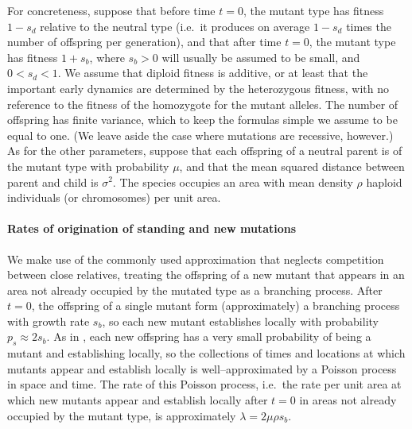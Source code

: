 \documentclass{article}
\begin{document}
For concreteness, suppose that before time $t=0$,
the mutant type has fitness $1-s_d$ relative to the neutral type
(i.e.\ it produces on average $1-s_d$ times the number of offspring per generation),
and that after time $t=0$,
the mutant type has fitness $1+s_b$,
where $s_b>0$ will usually be assumed to be small, and $0<s_d<1$.
We assume that diploid fitness is additive, or at least that the
important early dynamics are determined by the heterozygous fitness, with no reference to the fitness of the
homozygote for the mutant alleles.
The number of offspring has finite variance, which to keep the formulas simple we assume to be equal to one.
(We leave aside the case where mutations are recessive, however.)
As for the other parameters,
suppose that each offspring of a neutral parent is of the mutant type with probability $\mu$,
and that the mean squared distance between parent and child is $\sigma^2$.
The species occupies an area with mean density
$\rho$ haploid individuals (or chromosomes) per unit area.



\paragraph{Rates of origination of standing and new mutations}
We make use of the commonly used approximation that neglects competition between close relatives,
treating the offspring of a new mutant that appears in an area not already occupied by the mutated type
as a branching process.
After $t=0$, the offspring of a single mutant form (approximately) a branching process with growth rate $s_b$,
so each new mutant establishes locally with probability $p_s \approx 2s_b$.
As in \cite{ralphcoop2010}, each new offspring has a very small probability of being a mutant and establishing locally,
so the collections of times and locations at which mutants appear and establish locally 
is well--approximated by a Poisson process in space and time.
The rate of this Poisson process,
i.e.\ the rate per unit area at which new mutants appear and establish locally after $t=0$ in areas not already occupied by the mutant type,
is approximately $\lambda = 2 \mu \rho s_b$.
\end{document}
